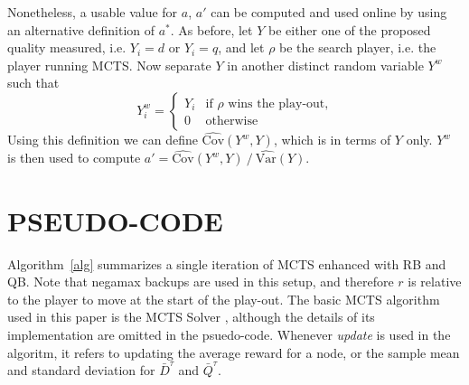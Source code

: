 \documentclass{ecai2014}
\newcommand{\SVar}[1]{\mathrm{\widehat{Var}}\left( #1 \right)}
\newcommand{\SCov}[1]{\mathrm{\widehat{Cov}}\left( #1 \right)}
\begin{document}
Nonetheless, a usable value for $a$, $a'$ can be computed and used online by using an alternative definition of $a^*$. As before, let $Y$ be either one of the proposed quality measured, i.e. $Y_i=d$ or $Y_i=q$, and let $\rho$ be the search player, i.e. the player running MCTS. Now separate $Y$ in another distinct random variable $Y^w$ such that
\begin{equation}
Y^w_i =
\begin{cases}
   Y_i & \text{if $\rho$ wins the play-out,} \\
   0   & \text{otherwise}
\end{cases}
\label{eq:ywin}
\end{equation}
Using this definition we can define $\SCov{Y^w,Y}$, which is in terms of $Y$ only. $Y^w$ is then used to compute $a'={\SCov{Y^w,Y}}\mathbin{/}{\SVar{Y}}$.

\section{PSEUDO-CODE}
Algorithm~\ref{alg} summarizes a single iteration of MCTS enhanced with RB and QB. Note that negamax backups are used in this setup, and therefore $r$ is relative to the player to move at the start of the play-out. The basic MCTS algorithm used in this paper is the MCTS Solver \cite{Winands2008}, although the details of its implementation are omitted in the psuedo-code. Whenever \emph{update} is used in the algoritm, it refers to updating the average reward for a node, or the sample mean and standard deviation for $\bar{D}^\tau$ and $\bar{Q}^\tau$.
\end{document}
